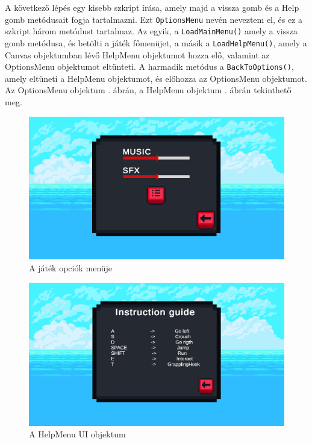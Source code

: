 A következő lépés egy kisebb szkript írása, amely majd a vissza gomb és a Help gomb metódusait fogja tartalmazni. Ezt \texttt{OptionsMenu} nevén neveztem el, és ez a szkript három metódust tartalmaz. Az egyik, a \texttt{LoadMainMenu()} amely a vissza gomb metódusa, és betölti a játék főmenüjet, a másik a \texttt{LoadHelpMenu()}, amely a Canvas objektumban lévő HelpMenu objektumot hozza elő, valamint az OptionsMenu objektumot eltünteti. A harmadik metódus a \texttt{BackToOptions()}, amely eltüneti a HelpMenu objektumot, és előhozza az OptionsMenu objektumot. 
\newpage
Az OptionsMenu objektum . ábrán, a HelpMenu objektum . ábrán tekinthető meg.

\begin{figure}[ht]
\centering
\includegraphics[scale = 0.4]{images/optionsmenu}
\caption{A játék opciók menüje}
\label{fig:optionsmenu}
\end{figure}

\begin{figure}[ht]
\centering
\includegraphics[scale=0.4]{images/helpmenu}
\caption{A HelpMenu UI objektum}
\label{fig:helpmenu}
\end{figure}





